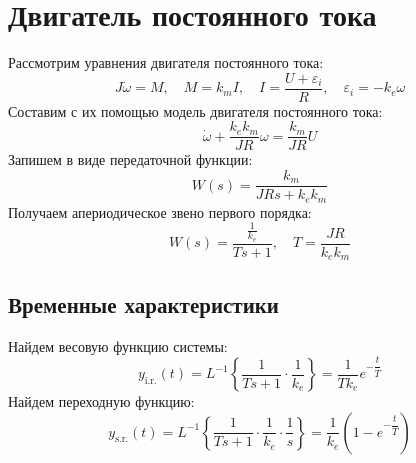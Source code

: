 \section{Двигатель постоянного тока}
Рассмотрим уравнения двигателя постоянного тока:
\begin{equation}
    J\dot{\omega} = M,\quad M = k_mI,\quad I=\frac{U + \varepsilon_i}{R},\quad\varepsilon_i = -k_e\omega
\end{equation}
Составим с их помощью модель двигателя постоянного тока:
\begin{equation}
    \dot{\omega} + \frac{k_ek_m}{JR}\omega = \frac{k_m}{JR} U
    \label{eq:dc_motor_deq}
\end{equation}
Запишем в виде передаточной функции:
\begin{equation}
    W(s) = \frac{k_m}{JRs + k_ek_m}
    \label{eq:dc_motor_tf}
\end{equation}
Получаем апериодическое звено первого порядка:
\begin{equation}
    W(s) = \frac{\frac{1}{k_e}}{Ts + 1}, \quad T = \frac{JR}{k_ek_m}
\end{equation}
\subsection{Временные характеристики}
\noindent Найдем весовую функцию системы:
\begin{equation}
    y_{\text{i.r.}}(t) = L^{-1}\left\{\frac{1}{Ts + 1}\cdot\frac{1}{k_e}\right\} = \frac{1}{Tk_e}e^{-\dfrac{t}{T}} 
\end{equation}
Найдем переходную функцию:
\begin{equation}
    y_{\text{s.r.}}(t) = L^{-1}\left\{\frac{1}{Ts + 1}\cdot\frac{1}{k_e}\cdot\frac{1}{s}\right\} = \frac{1}{k_e} \left(1 - e^{-\dfrac{t}{T}}\right)
\end{equation}


